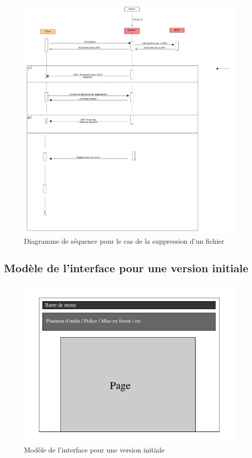 	\begin{figure}[hb]
	\centering
	\includegraphics[scale=.3]{setup/diagramme_sequence_suppression.png}
	
	\caption{Diagramme de séquence pour le cas de la suppression d'un fichier}
	\end{figure}

	\newpage	
	
	\subsection{Modèle de l'interface pour une version initiale}
	
	\begin{figure}[hb]
	\centering
	\includegraphics[scale=.6]{setup/modele_interface.png}
	
	\caption{Modèle de l'interface pour une version initiale}
	\end{figure}	
	
